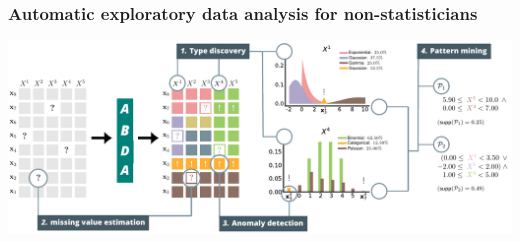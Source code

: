 \documentclass[xcolor={usenames,dvipsnames,svgnames}, compress, aspectratio=169, 11pt]{beamer}
\begin{document}


\begin{frame}[t, htt=mpigreen]
  \frametitle{Automatic exploratory data analysis for non-statisticians}
  \vspace{10pt}
  \includegraphics[width=1.04\linewidth]{figures/abda-full}\\

  
\end{frame}
\end{document}
